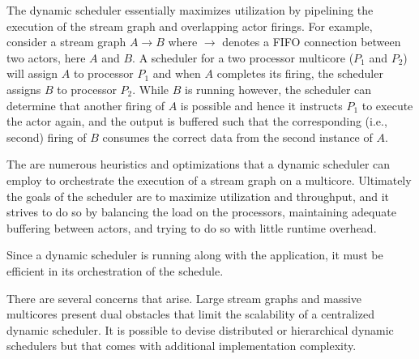The dynamic scheduler essentially maximizes utilization by pipelining
the execution of the stream graph and overlapping actor firings. For
example, consider a stream graph $A\rightarrow B$ where $\rightarrow$
denotes a FIFO connection between two actors, here $A$ and $B$. A
scheduler for a two processor multicore ($P_1$ and $P_2$) will assign
$A$ to processor $P_1$ and when $A$ completes its firing, the
scheduler assigns $B$ to processor $P_2$. While $B$ is running
however, the scheduler can determine that another firing of $A$ is
possible and hence it instructs $P_1$ to execute the actor again, and
the output is buffered such that the corresponding (i.e., second)
firing of $B$ consumes the correct data from the second instance of
$A$.


The are numerous heuristics and optimizations that a dynamic scheduler
can employ to orchestrate the execution of a stream graph on a
multicore. Ultimately the goals of the scheduler are to maximize
utilization and throughput, and it strives to do so by balancing the
load on the processors, maintaining adequate buffering between actors,
and trying to do so with little runtime overhead.

Since a dynamic scheduler is running along with the application, it
must be efficient in its orchestration of the schedule. 

There are several concerns that arise. Large stream graphs and massive
multicores present dual obstacles that limit the scalability of a
centralized dynamic scheduler. It is possible to devise distributed or
hierarchical dynamic schedulers but that comes with additional
implementation complexity.

